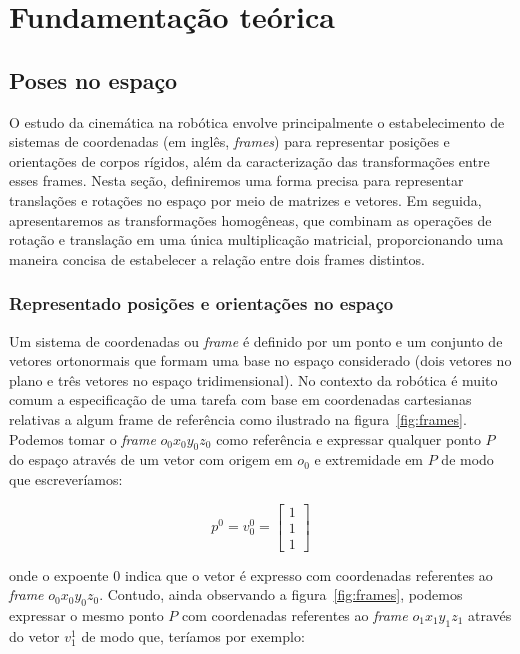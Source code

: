 \chapter{Fundamentação teórica}\label{cap:background}

\section{Poses no espaço}

O estudo da cinemática na robótica envolve principalmente o estabelecimento de
sistemas de coordenadas (em inglês, \emph{frames}) para representar posições e
orientações de corpos rígidos, além da caracterização das transformações entre
esses frames. Nesta seção, definiremos uma forma precisa para representar
translações e rotações no espaço por meio de matrizes e vetores. Em seguida,
apresentaremos as transformações homogêneas, que combinam as operações de
rotação e translação em uma única multiplicação matricial, proporcionando uma
maneira concisa de estabelecer a relação entre dois frames distintos.

\subsection{Representado posições e orientações no espaço}

Um sistema de coordenadas ou \emph{frame} é definido por um ponto e um conjunto
de vetores ortonormais que formam uma base no espaço considerado (dois vetores
no plano e três vetores no espaço tridimensional). No contexto da robótica é
muito comum a especificação de uma tarefa com base em coordenadas cartesianas
relativas a algum frame de referência como ilustrado na
figura~\ref{fig:frames}. Podemos tomar o \emph{frame} \(o_0 x_0 y_0 z_0\) como
referência e expressar qualquer ponto \(P\) do espaço através de um vetor com
origem em \(o_0\) e extremidade em \(P\) de modo que escreveríamos:

\begin{equation}
    p^0 = v_0^0 = \begin{bmatrix}
        1 \\
        1 \\
        1
    \end{bmatrix}
\end{equation}

onde o expoente \(0\) indica que o vetor é expresso com coordenadas referentes
ao \emph{frame} \(o_0 x_0 y_0 z_0\). Contudo, ainda observando a
figura~\ref{fig:frames}, podemos expressar o mesmo ponto \(P\) com coordenadas
referentes ao \emph{frame} \(o_1 x_1 y_1 z_1\) através do vetor \(v_1^1\) de
modo que, teríamos por exemplo:

